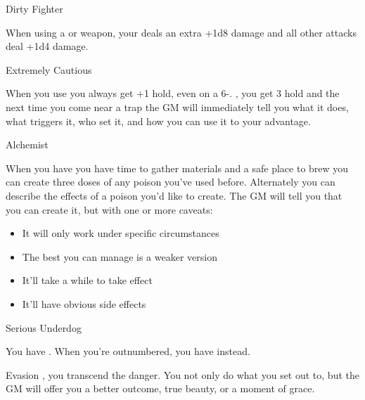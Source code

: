 \documentclass[8pt]{extarticle}
\begin{document}
\begin{multicols}{2}
\secondAdvances

\begin{amove}{Dirty Fighter}

  When using a  or  weapon, your
   deals an extra +1d8 damage and all other attacks
  deal +1d4 damage.
\end{amove}

\begin{amove}{Extremely Cautious}

  When you use  you always get +1 hold, even on a
  6-. \onMassiveSuccess, you get 3 hold and the next time you come
  near a trap the GM will immediately tell you what it does, what
  triggers it, who set it, and how you can use it to your advantage.
\end{amove}

\begin{amove}{Alchemist}

  When you have you have time to gather materials and a safe place to
  brew you can create three doses of any poison you’ve used
  before. Alternately you can describe the effects of a poison you’d
  like to create. The GM will tell you that you can create it, but
  with one or more caveats:

  \begin{itemize}
  \item It will only work under specific circumstances
  \item The best you can manage is a weaker version
  \item It’ll take a while to take effect
  \item It’ll have obvious side effects
  \end{itemize}

\end{amove}

\begin{amove}{Serious Underdog}

  You have . When you’re outnumbered, you have 
  instead.
\end{amove}

\begin{amove}{Evasion}
  , you transcend the danger. You not
  only do what you set out to, but the GM will offer you a better
  outcome, true beauty, or a moment of grace.
\end{amove}


\end{multicols}
\end{document}
